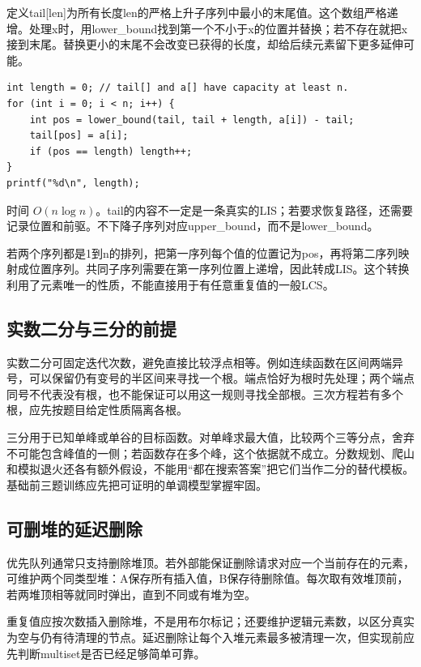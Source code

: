 定义tail[len]为所有长度len的严格上升子序列中最小的末尾值。这个数组严格递增。处理x时，用lower\_bound找到第一个不小于x的位置并替换；若不存在就把x接到末尾。替换更小的末尾不会改变已获得的长度，却给后续元素留下更多延伸可能。
\begin{lstlisting}
int length = 0; // tail[] and a[] have capacity at least n.
for (int i = 0; i < n; i++) {
    int pos = lower_bound(tail, tail + length, a[i]) - tail;
    tail[pos] = a[i];
    if (pos == length) length++;
}
printf("%d\n", length);
\end{lstlisting}
时间 $O(n\log n)$。tail的内容不一定是一条真实的LIS；若要求恢复路径，还需要记录位置和前驱。不下降子序列对应upper\_bound，而不是lower\_bound。

若两个序列都是1到n的排列，把第一序列每个值的位置记为pos，再将第二序列映射成位置序列。共同子序列需要在第一序列位置上递增，因此转成LIS。这个转换利用了元素唯一的性质，不能直接用于有任意重复值的一般LCS。

\subsection{实数二分与三分的前提}
实数二分可固定迭代次数，避免直接比较浮点相等。例如连续函数在区间两端异号，可以保留仍有变号的半区间来寻找一个根。端点恰好为根时先处理；两个端点同号不代表没有根，也不能保证可以用这一规则寻找全部根。三次方程若有多个根，应先按题目给定性质隔离各根。

三分用于已知单峰或单谷的目标函数。对单峰求最大值，比较两个三等分点，舍弃不可能包含峰值的一侧；若函数存在多个峰，这个依据就不成立。分数规划、爬山和模拟退火还各有额外假设，不能用“都在搜索答案”把它们当作二分的替代模板。基础前三题训练应先把可证明的单调模型掌握牢固。

\subsection{可删堆的延迟删除}
优先队列通常只支持删除堆顶。若外部能保证删除请求对应一个当前存在的元素，可维护两个同类型堆：A保存所有插入值，B保存待删除值。每次取有效堆顶前，若两堆顶相等就同时弹出，直到不同或有堆为空。

重复值应按次数插入删除堆，不是用布尔标记；还要维护逻辑元素数，以区分真实为空与仍有待清理的节点。延迟删除让每个入堆元素最多被清理一次，但实现前应先判断multiset是否已经足够简单可靠。

